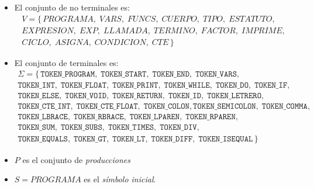 \documentclass[12pt, letterpaper]{article}
\theoremstyle{definition}
\begin{document}
\begin{itemize}
    \item El conjunto de no terminales es:
    \begin{multline*}
        V = \{\, \mathit{PROGRAMA},\; \mathit{VARS},\; \mathit{FUNCS},\;
                 \mathit{CUERPO},\; \mathit{TIPO},\; \mathit{ESTATUTO},\; \\
                 \mathit{EXPRESION},\; \mathit{EXP},\; \mathit{LLAMADA},\;
                 \mathit{TERMINO},\; \mathit{FACTOR},\; \mathit{IMPRIME},\; \\
                 \mathit{CICLO},\; \mathit{ASIGNA},\; \mathit{CONDICION},\;
                 \mathit{CTE} \,\}
    \end{multline*} 
    \item El conjunto de terminales es:
    \begin{multline*}
        \Sigma = \{\,
                 \texttt{TOKEN\_PROGRAM},\; \texttt{TOKEN\_START},\;
                 \texttt{TOKEN\_END},\; \texttt{TOKEN\_VARS},\; \\
                 \texttt{TOKEN\_INT},\; \texttt{TOKEN\_FLOAT},\;
                 \texttt{TOKEN\_PRINT},\; \texttt{TOKEN\_WHILE},\;
                 \texttt{TOKEN\_DO},\; \texttt{TOKEN\_IF},\; \\
                 \texttt{TOKEN\_ELSE},\; \texttt{TOKEN\_VOID},\; \texttt{TOKEN\_RETURN},\;
                 \texttt{TOKEN\_ID},\; \texttt{TOKEN\_LETRERO},\; \\
                 \texttt{TOKEN\_CTE\_INT},\; \texttt{TOKEN\_CTE\_FLOAT},\;
                 \texttt{TOKEN\_COLON}, \texttt{TOKEN\_SEMICOLON},\; \texttt{TOKEN\_COMMA},\; \\
                 \texttt{TOKEN\_LBRACE},\; \texttt{TOKEN\_RBRACE},\;
                 \texttt{TOKEN\_LPAREN},\; \texttt{TOKEN\_RPAREN},\; \\
                 \texttt{TOKEN\_SUM},\; \texttt{TOKEN\_SUBS},\;
                 \texttt{TOKEN\_TIMES},\; \texttt{TOKEN\_DIV},\; \\
                 \texttt{TOKEN\_EQUALS},\; \texttt{TOKEN\_GT},\;
                 \texttt{TOKEN\_LT},\; \texttt{TOKEN\_DIFF},\;
                 \texttt{TOKEN\_ISEQUAL} \,\}
    \end{multline*} 

    \item $P$ es el conjunto de \emph{producciones}  

    \item $S = \mathit{PROGRAMA}$ es el \emph{símbolo inicial}.
\end{itemize}
\end{document}
